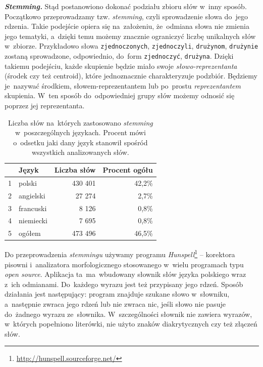 \documentclass{praca1}
\begin{document}
\emph{\textbf{Stemming.}}
Stąd postanowiono dokonać podziału zbioru słów w~inny sposób. Początkowo przeprowadzamy tzw. \emph{stemming}, czyli sprowadzenie słowa do~jego rdzenia. Takie podejście opiera się na~założeniu, że~odmiana słowa nie zmienia jego tematyki, a~dzięki temu możemy znacznie ograniczyć liczbę unikalnych słów w~zbiorze. Przykładowo słowa \verb|zjednoczonych|, \verb|zjednoczyli|, \verb|drużynom|, \verb|drużynie| zostaną sprowadzone, odpowiednio, do~form \verb|zjednoczyć|, \verb|drużyna|. Dzięki takiemu podejściu, każde skupienie będzie miało swoje \emph{słowo-reprezentanta} (środek czy też centroid), które jednoznacznie charakteryzuje podzbiór. Będziemy je~nazywać środkiem, słowem-reprezentantem lub po~prostu \emph{reprezentantem} skupienia. W~ten sposób do~odpowiedniej grupy słów możemy odnosić się poprzez jej reprezentanta.
\vspace*{-0.4cm}
\begin{table}[!h]
\centering
\caption{Liczba słów na~których zastosowano \emph{stemming} w~poszczególnych językach. Procent mówi o~odsetku jaki dany język stanowił spośród wszystkich analizowanych słów.} \smallskip
\begin{tabular}{|rl|rr|}
  \hline
 & Język & Liczba słów & Procent ogółu\\ 
  \hline
1 & polski & 430 401 & 42,2\% \\ 
  2 & angielski & 27 274 & 2,7\% \\ 
  3 & francuski & 8 126 & 0,8\% \\ 
  4 & niemiecki & 7 695 & 0,8\% \\ \hline
  5 & ogółem & 473 496 & 46,5\% \\ 
   \hline
\end{tabular}
\label{tab:002}
\end{table}

Do przeprowadzenia \emph{stemmingu} używamy programu \emph{Hunspell}\footnote{\url{http://hunspell.sourceforge.net/}} -- korektora pisowni i~analizatora morfologicznego stosowanego w~wielu programach typu \emph{open source}. Aplikacja ta~ma~wbudowany słownik słów języka polskiego wraz z~ich odmianami. Do~każdego wyrazu jest też przypisany jego rdzeń. Sposób działania jest następujący: program znajduje szukane słowo w~słowniku, a~następnie zwraca jego rdzeń lub nie zwraca nic, jeśli słowo nie pasuje do~żadnego wyrazu ze~słownika. W~szczególności słownik nie zawiera wyrazów, w~których popełniono literówki, nie użyto znaków diakrytycznych czy też złączeń słów.
\end{document}
